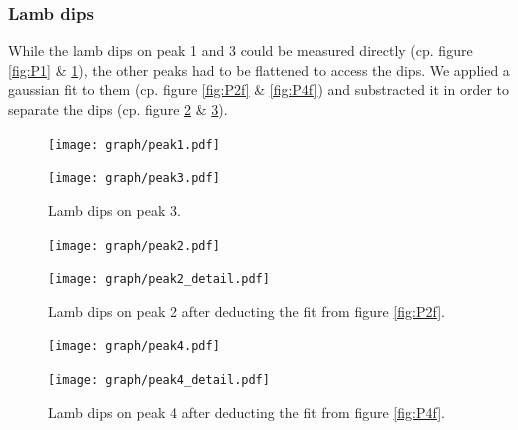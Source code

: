 

\subsubsection{Lamb dips}

While the lamb dips on peak 1 and 3 could be measured directly (cp. figure \ref{fig:P1} \& \ref{fig:P3}), the other peaks had to be flattened to access the dips. We applied a gaussian fit to them  (cp. figure \ref{fig:P2f} \& \ref{fig:P4f}) and substracted it in order to separate the dips (cp. figure \ref{fig:P2} \& \ref{fig:P4}).



\begin{figure}[p]
	\centering
	\texttt{[image: graph/peak1.pdf]}
	\vspace{-1ex}
	\caption{Lamb dips on peak 1.}
	\label{fig:P1}
	\vspace{2ex}

	\texttt{[image: graph/peak3.pdf]}
	\vspace{-1ex}
	\caption{Lamb dips on peak 3.}
	\label{fig:P3}
	\vspace{-2em}
\end{figure}

\begin{figure}[p]
	\centering
	\texttt{[image: graph/peak2.pdf]}
	\vspace{-1ex}
	\caption{Lamb dips on peak 2.}
	\label{fig:P2f}
	\vspace{2ex}

	\texttt{[image: graph/peak2\_detail.pdf]}
	\vspace{-1ex}
	\caption{Lamb dips on peak 2 after deducting the fit from figure \ref{fig:P2f}.}
	\label{fig:P2}
	\vspace{-2em}
\end{figure}

\begin{figure}[p]
	\centering
	\texttt{[image: graph/peak4.pdf]}
	\vspace{-1ex}
	\caption{Lamb dips on peak 4.}
	\label{fig:P4f}
	\vspace{2ex}

	\texttt{[image: graph/peak4\_detail.pdf]}
	\vspace{-1ex}
	\caption{Lamb dips on peak 4 after deducting the fit from figure \ref{fig:P4f}.}
	\label{fig:P4}
	\vspace{-2em}
\end{figure}

